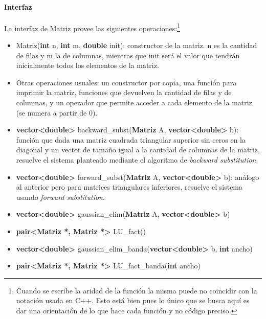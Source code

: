 \paragraph{Interfaz}
La interfaz de Matriz provee las siguientes operaciones:\footnote{Cuando se escribe la aridad de la función la misma puede no coincidir con la notación usada en C++. Esto está bien pues lo único que se busca aquí es dar una orientación de lo que hace cada función y no código preciso.}

\begin{itemize}
	\item Matriz(\textbf{int} n, \textbf{int} m, \textbf{double} init): constructor de la matriz. n es la cantidad de filas y m la de columnas, mientras que init será el valor que tendrán inicialmente todos los elementos de la matriz.

	\item Otras operaciones usuales: un constructor por copia, una función para imprimir la matriz, funciones que devuelven la cantidad de filas y de columnas, y un operador que permite acceder a cada elemento de la matriz (se numera a partir de 0).

	\item \textbf{vector<double>} backward\_subst(\textbf{Matriz} A, \textbf{vector<double>} b): función que dada una matriz cuadrada triangular superior sin ceros en la diagonal y un vector de tamaño igual a la cantidad de columnas de la matriz, resuelve el sistema planteado mediante el algoritmo de \textit{backward substitution}.

	\item \textbf{vector<double>} forward\_subst(\textbf{Matriz} A, \textbf{vector<double>} b): análogo al anterior pero para matrices triangulares inferiores, resuelve el sistema usando \textit{forward substitution}.

	\item \textbf{vector<double>} gaussian\_elim(\textbf{Matriz} A, \textbf{vector<double>} b)

	\item \textbf{pair<Matriz *, Matriz *>} LU\_fact()
	
	\item \textbf{vector<double>} gaussian\_elim\_banda(\textbf{vector<double>} b, \textbf{int} ancho)
	
	\item \textbf{pair<Matriz *, Matriz *>} LU\_fact\_banda(\textbf{int} ancho)
\end{itemize}

